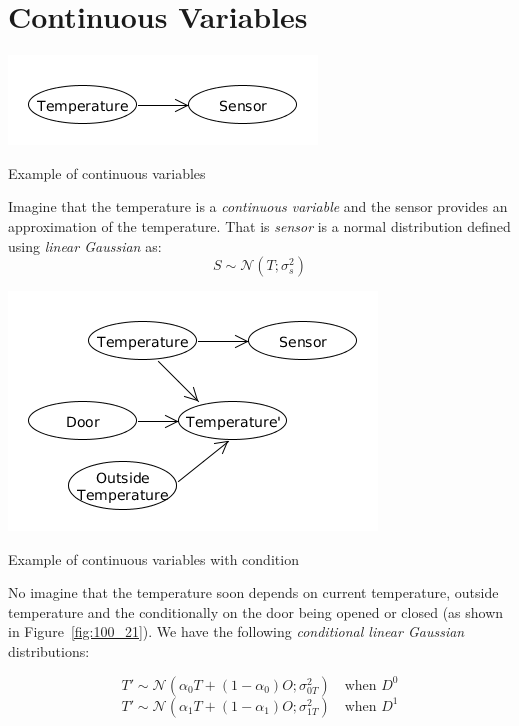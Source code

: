 \section{Continuous Variables}
\begin{marginfigure}
\includegraphics{images/100_20}
\caption{Example of continuous variables}
\label{fig:100_20}
\end{marginfigure}

Imagine that the temperature is a \emph{continuous variable} and the sensor provides an approximation of the temperature.  That is \emph{sensor}  is a normal distribution defined using \emph{linear Gaussian} as: \[ S \sim \mathcal{N} (T; \sigma^2_s )\]


\begin{marginfigure}
\includegraphics{images/100_21}
\caption{Example of continuous variables with condition}
\label{fig:100_21}
\end{marginfigure}
No imagine that the temperature soon  depends on current temperature, outside temperature and the conditionally on the door being opened or closed (as shown in Figure~\ref{fig:100_21}).  We have the following \emph{conditional linear Gaussian} distributions:

\[ T' \sim \mathcal{N} (\alpha_0T + (1-\alpha_0)O; \sigma^2_{0T} ) \quad \text{when } D^0\]
\[ T' \sim \mathcal{N} (\alpha_1T + (1-\alpha_1)O; \sigma^2_{1T} ) \quad \text{when } D^1\]



